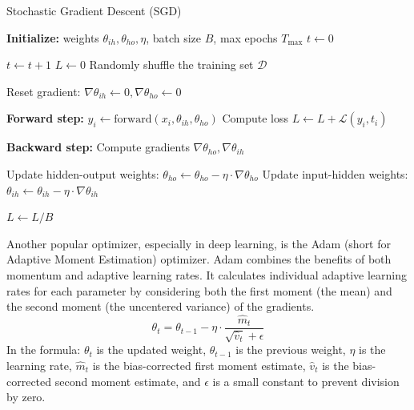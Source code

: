 \begin{algorithm}
\caption{Stochastic Gradient Descent (SGD)}
\begin{algorithmic}[1]
\State \textbf{Initialize:} weights $\theta_{ih}, \theta_{ho}, \eta$, batch size $B$, max epochs $T_{\text{max}}$
\State $t \gets 0$

\Repeat
    \State $t \gets t + 1$
    \State $L \gets 0$ 
    \State Randomly shuffle the training set $\mathcal{D}$

        \State Reset gradient: $\nabla \theta_{ih} \gets 0, \nabla \theta_{ho} \gets 0$
        
            \State \textbf{Forward step:} $y_i \gets \text{forward}(x_i, \theta_{ih}, \theta_{ho})$
            \State Compute loss $L \gets L + \mathcal{L}(y_i, t_i)$
            
            \State \textbf{Backward step:} Compute gradients $\nabla \theta_{ho}, \nabla \theta_{ih}$ 
        \EndFor

        \State Update hidden-output weights: $\theta_{ho} \gets \theta_{ho} - \eta \cdot \nabla \theta_{ho}$
        \State Update input-hidden weights: $\theta_{ih} \gets \theta_{ih} - \eta \cdot \nabla \theta_{ih}$
        
        \State $L \gets L / B$ 
    \EndFor
    

\end{algorithmic}
\end{algorithm}

Another popular optimizer, especially in deep learning, is the Adam (short for Adaptive Moment Estimation) optimizer. Adam combines the benefits of both momentum and adaptive learning rates. It calculates individual adaptive learning rates for each parameter by considering both the first moment (the mean) and the second moment (the uncentered variance) of the gradients.
\begin{equation}
    \theta_t = \theta_{t-1} - \eta \cdot \frac{\hat{m}_t}{\sqrt{\hat{v}_t} + \epsilon}
\end{equation}
In the formula: \(\theta_t\) is the updated weight, \(\theta_{t-1}\) is the previous weight, \(\eta\) is the learning rate, \(\hat{m}_t\) is the bias-corrected first moment estimate, \(\hat{v}_t\) is the bias-corrected second moment estimate, and \(\epsilon\) is a small constant to prevent division by zero.


